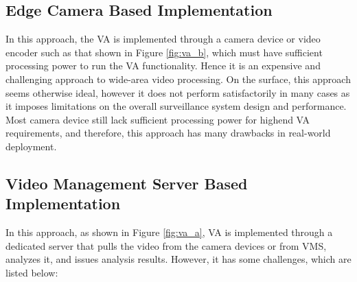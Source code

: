\subsection{Edge Camera Based Implementation}
In this approach, the VA is implemented through a  camera device or video encoder \cite{chen2017smart} such as that shown in Figure \ref{fig:va_b}, which must have sufficient processing power to run the VA functionality. Hence it is an expensive and challenging approach to wide-area video processing. On the surface, this approach seems otherwise ideal, however it does not perform satisfactorily in many cases as it imposes limitations on the overall surveillance system design and performance. Most camera device still lack sufficient processing power for highend VA requirements, and therefore, this approach has many drawbacks in real-world deployment. 
\subsection{Video Management Server Based Implementation}
In this approach, as shown in Figure \ref{fig:va_a}, VA is implemented through a dedicated server that pulls the video from the camera devices or from VMS, analyzes it, and issues analysis results. However, it has some challenges, which are listed below:
